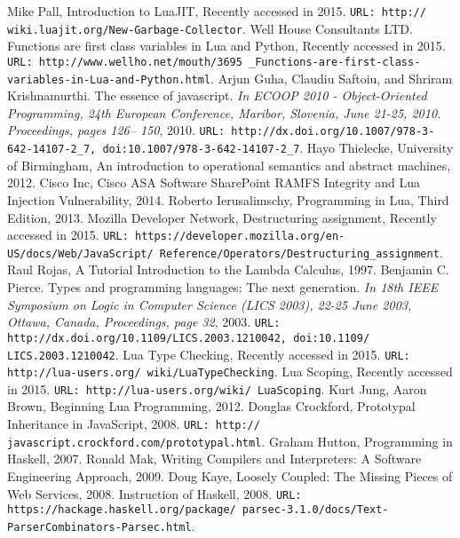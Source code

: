 \begin{thebibliography}{10}
 Mike Pall, Introduction to LuaJIT, Recently accessed in 2015. {\tt URL: http://
wiki.luajit.org/New-Garbage-Collector}.
 Well House Consultants LTD. Functions are first class variables in Lua and Python, Recently accessed in 2015. 
{\tt URL: http://www.wellho.net/mouth/3695
\_Functions-are-first-class-variables-in-Lua-and-Python.html}.
 Arjun Guha, Claudiu Saftoiu, and Shriram Krishnamurthi. The essence of javascript. {\it In ECOOP 2010 - Object-Oriented Programming, 24th European Conference, Maribor, Slovenia, June 21-25, 2010. Proceedings, pages 126– 150}, 2010. {\tt URL: http://dx.doi.org/10.1007/978-3-642-14107-2\_7, doi:10.1007/978-3-642-14107-2\_7}.
 Hayo Thielecke, University of Birmingham, An introduction to operational semantics and abstract machines, 2012.
 Cisco Inc, Cisco ASA Software SharePoint RAMFS Integrity and Lua Injection Vulnerability, 2014.
 Roberto Ierusalimschy, Programming in Lua, Third Edition,  2013.
 Mozilla Developer Network, Destructuring assignment, Recently accessed in 2015. {\tt URL: https://developer.mozilla.org/en-US/docs/Web/JavaScript/
Reference/Operators/Destructuring\_assignment}.
 Raul Rojas, A Tutorial Introduction to the Lambda Calculus, 1997.
 Benjamin C. Pierce. Types and programming languages: The next generation. {\it In 18th IEEE Symposium on Logic in Computer Science (LICS 2003), 22-25 June 2003, Ottawa, Canada, Proceedings, page 32}, 2003. {\tt URL: http://dx.doi.org/10.1109/LICS.2003.1210042, doi:10.1109/ LICS.2003.1210042}.
 Lua Type Checking, Recently accessed in 2015. {\tt URL: http://lua-users.org/
wiki/LuaTypeChecking}.
 Lua Scoping, Recently accessed in 2015. {\tt URL: http://lua-users.org/wiki/
LuaScoping}.
 Kurt Jung, Aaron Brown, Beginning Lua Programming, 2012.
 Douglas Crockford, Prototypal Inheritance in JavaScript, 2008. {\tt URL: http://
javascript.crockford.com/prototypal.html}.
 Graham Hutton, Programming in Haskell, 2007.
 Ronald Mak, Writing Compilers and Interpreters: A Software Engineering Approach, 2009.
 Doug Kaye, Loosely Coupled: The Missing Pieces of Web Services, 2008.
 Instruction of Haskell, 2008. {\tt URL: https://hackage.haskell.org/package/
parsec-3.1.0/docs/Text-ParserCombinators-Parsec.html}.
\\

\end{thebibliography}
